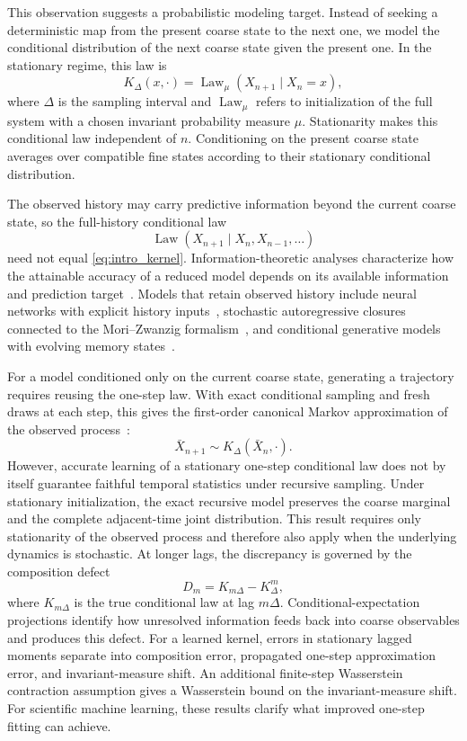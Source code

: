 \documentclass[final,hidelinks]{siamart251216}
\newcommand{\Law}{\operatorname{Law}}
\begin{document}
This observation suggests a probabilistic modeling target. Instead of
seeking a deterministic map from the present coarse state to the next one,
we model the conditional distribution of the next coarse state given the
present one. In the stationary regime, this law is
\begin{equation}
    K_\Delta(x,\cdot)
    =\Law_\mu(X_{n+1}\mid X_n=x),
    \label{eq:intro_kernel}
\end{equation}
where $\Delta$ is the sampling interval and $\Law_\mu$ refers to initialization of the full system with a chosen invariant probability measure $\mu$. Stationarity makes this conditional law independent of $n$. Conditioning on the present coarse state averages over compatible fine states according to their stationary conditional distribution.

The observed history may carry predictive information beyond the current coarse state, so the full-history conditional law
\begin{equation}
    \Law(X_{n+1}\mid X_n,X_{n-1},\ldots)
    \label{eq:intro_history}
\end{equation}
need not equal \eqref{eq:intro_kernel}. Information-theoretic analyses characterize how the attainable accuracy of a reduced model depends on its available information and prediction target~\cite{lozanoduran2026ladder}. Models that retain observed history include neural networks with explicit history inputs~\cite{fu2020memory}, stochastic autoregressive closures connected to the Mori--Zwanzig
formalism~\cite{linlu2021}, and conditional generative models with evolving memory states~\cite{armegioiu2026memory,yanghe2026memory}.

For a model conditioned only on the current coarse state, generating a trajectory requires reusing the one-step law. With exact conditional sampling and fresh draws at each step, this gives the first-order
canonical Markov approximation of the observed process~\cite{gray2011}:
\begin{equation}
    \bar X_{n+1}\sim K_\Delta(\bar X_n,\cdot).
    \label{eq:recursive_surrogate_intro}
\end{equation}
However, accurate learning of a stationary one-step conditional law does not by itself guarantee faithful temporal statistics under recursive sampling. Under stationary initialization, the exact recursive model preserves the coarse marginal and the complete adjacent-time joint distribution. This result requires only stationarity of the observed process and therefore also apply when the underlying dynamics is stochastic. At longer lags, the discrepancy is governed by the composition defect
\[
    D_m=K_{m\Delta}-K_\Delta^m,
\]
where $K_{m\Delta}$ is the true conditional law at lag $m\Delta$. Conditional-expectation projections identify how unresolved information feeds back into coarse observables and produces this defect. For a learned kernel, errors in stationary lagged moments separate into composition error, propagated one-step approximation error, and invariant-measure shift. An additional finite-step Wasserstein contraction assumption gives a Wasserstein bound on the invariant-measure shift. For scientific machine learning, these results clarify what improved one-step fitting can achieve.
\end{document}
